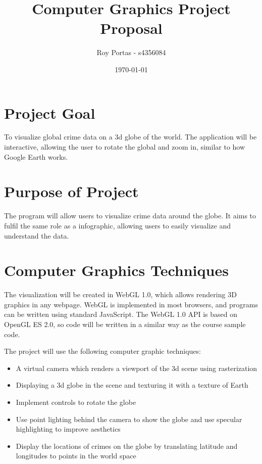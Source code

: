 \documentclass[]{article}
\begin{document}
\title{Computer Graphics Project Proposal}
\author{Roy Portas - s4356084}
\date{\today}
\maketitle 

\section*{Project Goal}

To visualize global crime data on a 3d globe of the world.
The application will be interactive, allowing the user to rotate the global and zoom in, similar to how Google Earth works.

\section*{Purpose of Project}

The program will allow users to visualize crime data around the globe.
It aims to fulfil the same role as a infographic, allowing users to easily visualize and understand the data.

\section*{Computer Graphics Techniques}

The visualization will be created in WebGL 1.0, which allows rendering 3D graphics in any webpage.
WebGL is implemented in most browsers, and programs can be written using standard JavaScript.
The WebGL 1.0 API is based on OpenGL ES 2.0, so code will be written in a similar way as the course sample code.

The project will use the following computer graphic techniques:
\begin{itemize}
    \item A virtual camera which renders a viewport of the 3d scene using rasterization
    \item Displaying a 3d globe in the scene and texturing it with a texture of Earth
    \item Implement controls to rotate the globe
    \item Use point lighting behind the camera to show the globe and use specular highlighting to improve aesthetics
    \item Display the locations of crimes on the globe by translating latitude and longitudes to points in the world space
\end{itemize}
\end{document}
